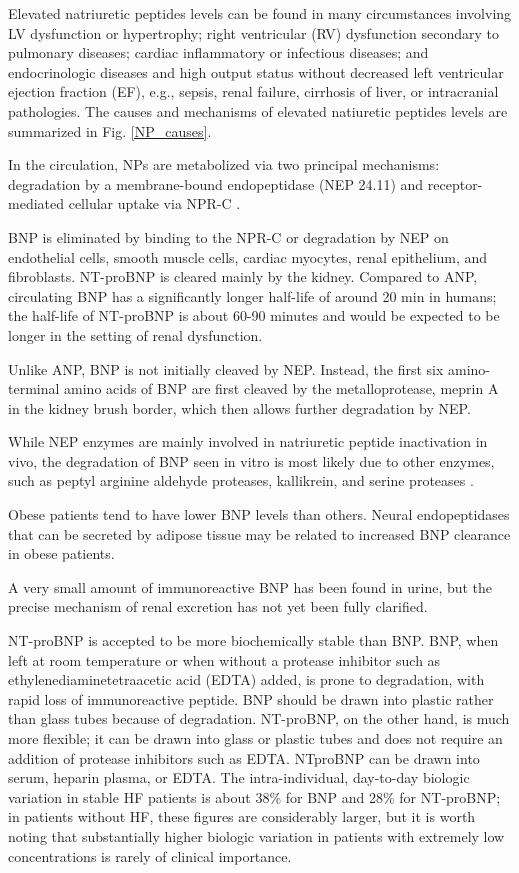 \documentclass[14pt,a4paper,onecolumn]{extarticle}
\begin{document}
Elevated natriuretic peptides levels can be found in many circumstances involving LV dysfunction or hypertrophy; right ventricular (RV) dysfunction secondary to pulmonary diseases; cardiac inflammatory or infectious diseases; and endocrinologic diseases and high output status without decreased left ventricular ejection fraction (EF), e.g., sepsis, renal failure, cirrhosis of liver, or intracranial pathologies. The causes and mechanisms of elevated natiuretic peptides levels are summarized in Fig. \ref{NP_causes}. %

In the circulation, NPs are metabolized via two principal mechanisms: degradation by a membrane-bound endopeptidase (NEP 24.11) and receptor-mediated cellular uptake via NPR-C \citep{14}.

BNP is eliminated by binding to the NPR-C or degradation by NEP on endothelial cells, smooth muscle cells, cardiac myocytes, renal epithelium, and fibroblasts. NT-proBNP is cleared mainly by the kidney. Compared to ANP, circulating BNP has a significantly longer half-life of around 20 min in humans; the half-life of NT-proBNP is about 60-90 minutes and would be expected to be longer in the setting of renal dysfunction. \citep{Pankow2007}

Unlike ANP, BNP is not initially cleaved by NEP. Instead, the first six amino-terminal amino acids of BNP are first cleaved by the metalloprotease, meprin A in the kidney brush border, which then allows further degradation by NEP. \citep{Pankow2007}

While NEP enzymes are mainly involved in natriuretic peptide inactivation in vivo, the degradation of BNP seen in vitro is most likely due to other enzymes, such as peptyl arginine aldehyde proteases, kallikrein, and serine proteases \citep{15}.

Obese patients tend to have lower BNP levels than others. Neural endopeptidases that can be secreted by adipose tissue may be related to increased BNP clearance in obese patients. \citep{Yang2004}

A very small amount of immunoreactive BNP has been found in urine, but the precise mechanism of renal excretion has not yet been fully clarified. \citep{203}

NT-proBNP is accepted to be more biochemically stable than BNP. BNP, when left at room temperature or when without a protease inhibitor such as ethylenediaminetetraacetic acid (EDTA) added, is prone to degradation, with rapid loss of immunoreactive peptide. BNP should be drawn into plastic rather than glass tubes because of degradation. NT-proBNP, on the other hand, is much more flexible; it can be drawn into glass or plastic tubes and does not require an addition of protease inhibitors such as EDTA. NTproBNP can be drawn into serum, heparin plasma, or EDTA. The intra-individual, day-to-day biologic variation in stable HF patients is about 38\% for BNP and 28\% for NT-proBNP; in patients without HF, these figures are considerably larger, but it is worth noting that substantially higher biologic variation in patients with extremely low concentrations is rarely of clinical importance. \citep{Gaggin2014} %
\end{document}

